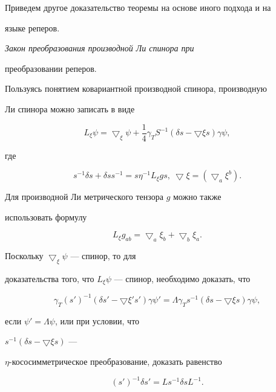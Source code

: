 Приведем другое доказательство теоремы на основе иного подхода и на


языке реперов.





{\it Закон преобразования производной Ли спинора при 


преобразовании реперов.}


Пользуясь понятием ковариантной производной спинора, производную


Ли спинора можно записать в виде


$$


L_\xi\psi=\bigtriangledown_\xi\psi+\frac{1}{4}\gamma_TS^{-1}(\delta s


-\bigtriangledown\xi s)\gamma\psi,


$$


где


$$


s^{-1}\delta s+\delta ss^{-1}=s\eta^{-1}L_\xi gs,\


\bigtriangledown\xi=(\bigtriangledown_a\xi^b).


$$


Для производной Ли метрического тензора $g$ можно также


использовать формулу


$$


L_\xi g_{ab}=\bigtriangledown_a\xi_b+\bigtriangledown_b\xi_a.


$$


Поскольку $\bigtriangledown_\xi\psi$ --- спинор, то для


доказательства того, что $L_\xi\psi$ --- спинор, необходимо доказать, что


$$


\gamma_T(s'{})^{-1}(\delta s'-\bigtriangledown\xi's')\gamma\psi'=


\Lambda\gamma_Ts^{-1}(\delta s-\bigtriangledown\xi s)\gamma\psi,


$$


если $\psi'=\Lambda\psi$, или при условии, что


$s^{-1}(\delta s-\bigtriangledown\xi s)$ ---


$\eta$-кососимметрическое преобразование, доказать равенство


\begin{equation}


(s'{})^{-1}\delta s'=Ls^{-1}\delta sL^{-1}.


\end{equation}


